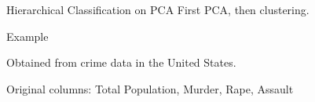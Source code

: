 \begin{frame}{Hierarchical Classification on PCA}
  First PCA, then clustering.

\end{frame}

\begin{frame}{Example}

  Obtained from crime data in the United States.

  Original columns: Total Population, Murder, Rape, Assault
\end{frame}
